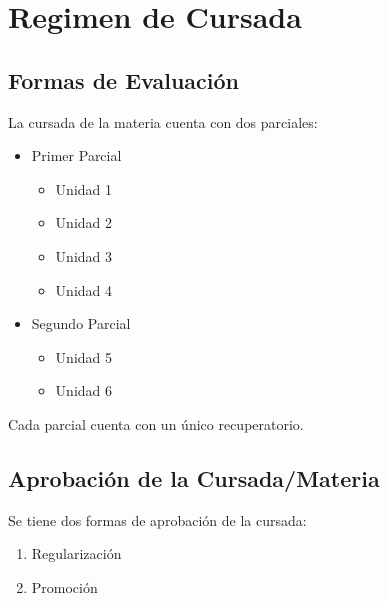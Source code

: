 \documentclass[
  letterpaper,
  DIV=11,
  numbers=noendperiod]{scrreprt}
\providecommand{\tightlist}{%
  \setlength{\itemsep}{0pt}\setlength{\parskip}{0pt}}\usepackage{longtable,booktabs,array}
\begin{document}

\chapter*{Regimen de Cursada}\label{regimen-de-cursada}


\section*{Formas de Evaluación}\label{formas-de-evaluaciuxf3n}


La cursada de la materia cuenta con dos parciales:

\begin{itemize}
\tightlist
\item
  Primer Parcial

  \begin{itemize}
  \tightlist
  \item
    Unidad 1
  \item
    Unidad 2
  \item
    Unidad 3
  \item
    Unidad 4
  \end{itemize}
\item
  Segundo Parcial

  \begin{itemize}
  \tightlist
  \item
    Unidad 5
  \item
    Unidad 6
  \end{itemize}
\end{itemize}

Cada parcial cuenta con un único recuperatorio.

\section*{Aprobación de la
Cursada/Materia}\label{aprobaciuxf3n-de-la-cursadamateria}


Se tiene dos formas de aprobación de la cursada:

\begin{enumerate}
\def\labelenumi{\arabic{enumi}.}
\tightlist
\item
  Regularización
\item
  Promoción
\end{enumerate}
\end{document}
